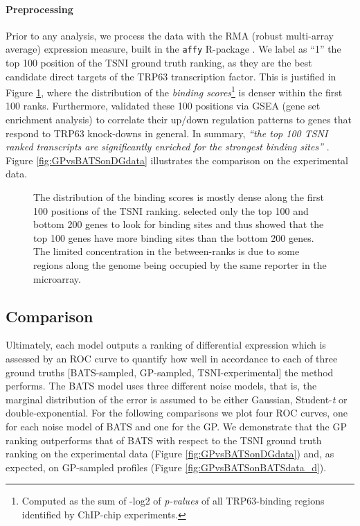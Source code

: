       \paragraph{Preprocessing} Prior to any analysis, we process the data with the RMA (robust multi-array average)
      expression measure, built in the \texttt{affy} R-package \citep{irizarry2003exploration}.
      We label as ``1'' the top 100 position of the TSNI ground truth ranking,
      as they are the best candidate direct targets of the TRP63 transcription factor.
      This is justified in Figure \ref{fig:distribBScore}, where the distribution of the
      \textit{binding scores}\footnote{Computed as the sum of -log2 of
      \textit{p-values} of all TRP63-binding regions identified by ChIP-chip experiments.}
      is denser within the first 100 ranks.
      Furthermore, \citet{della2008direct} validated these 100 positions via GSEA (gene set enrichment analysis)
      \citep{subramanian2005gene} to correlate their up/down regulation patterns
      to genes that respond to TRP63 knock-downs in general.
      In summary, \textit{``the top 100 TSNI ranked transcripts are
      significantly enriched for  the strongest binding sites''}
      \citep{della2008direct}. Figure \ref{fig:GPvsBATSonDGdata} illustrates the
      comparison on the experimental data.

      \begin{figure}[!htbp]
	\centering
	\caption[Distribution of binding scores along the TSNI ranking.] {
	  The distribution of the binding scores is mostly
	  dense along the first 100 positions of the TSNI ranking.
	  \citet{della2008direct} selected only the top 100 and bottom 200 genes
	  to look for binding sites and thus showed that the top 100 genes
	  have more binding sites than the bottom 200 genes. The limited
	  concentration in the between-ranks is due to some regions along the
	  genome being occupied by the same reporter in the microarray.}
	\label{fig:distribBScore}
      \end{figure}

    \subsection{Comparison}
      Ultimately, each model outputs a ranking of differential
      expression which is assessed by an ROC curve to quantify how well in accordance
      to each of three ground truths [BATS-sampled, GP-sampled, TSNI-experimental] the method performs.
      The BATS model uses three different noise models, that is, the marginal distribution of the error is
      assumed to be either Gaussian, Student-\textit{t} or double-exponential.
      For the following comparisons we plot four ROC curves, one
      for each noise model of BATS and one for the GP. We demonstrate that the
      GP ranking outperforms that of BATS with respect to the TSNI ground truth
      ranking on the experimental data (Figure \ref{fig:GPvsBATSonDGdata}) and,
      as expected, on GP-sampled profiles (Figure \ref{fig:GPvsBATSonBATSdata_d}).

